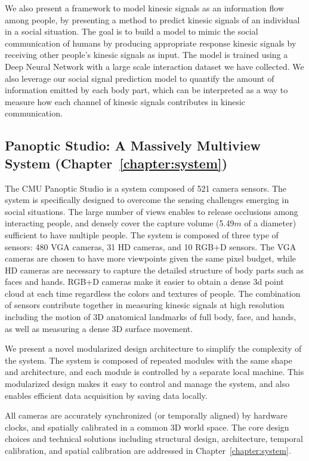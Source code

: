 We also present a framework to model kinesic signals as an information flow among people, by presenting a method to predict kinesic signals of an individual in a social situation. The goal is to build a model to mimic the social communication of humans by producing appropriate response kinesic signals by receiving other people's kinesic signals as input. The model is trained using a Deep Neural Network with a large scale interaction dataset we have collected. We also leverage our social signal prediction model to quantify the amount of information emitted by each body part, which can be interpreted as a way to measure how each channel of kinesic signals contributes in kinesic communication. 

\subsection{Panoptic Studio: A Massively Multiview System (Chapter~\ref{chapter:system})}
The CMU Panoptic Studio is a system composed of 521 camera sensors. The system is specifically designed to overcome the sensing challenges emerging in social situations. The large number of views enables to release occlusions among interacting people, and densely cover the capture volume (5.49$m$ of a diameter) sufficient to have multiple people. The system is composed of three type of sensors: 480 VGA cameras, 31 HD cameras, and 10 RGB+D sensors. The VGA cameras are chosen to have more viewpoints given the same pixel budget, while HD cameras are necessary to capture the detailed structure of body parts such as faces and hands. RGB+D cameras make it easier to obtain a dense 3d point cloud at each time regardless the colors and textures of people. The combination of sensors contribute together in measuring kinesic signals at high resolution including the motion of 3D anatomical landmarks of full body, face, and hands, as well as measuring a dense 3D surface movement. 

We present a novel modularized design architecture to simplify the complexity of the system. The system is composed of repeated modules with the same shape and architecture, and each module is controlled by a separate local machine. This modularized design makes it easy to control and manage the system, and also enables efficient data acquisition by saving data locally. 

All cameras are accurately synchronized (or temporally aligned) by hardware clocks, and spatially calibrated in a common 3D world space. The core design choices and technical solutions including structural design, architecture, temporal calibration, and spatial calibration are addressed in Chapter~\ref{chapter:system}.

